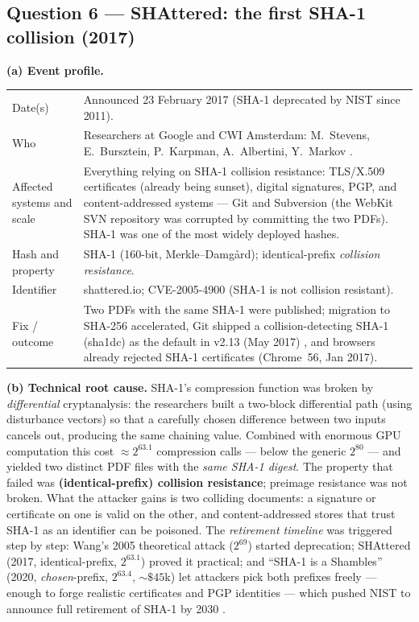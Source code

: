 \documentclass[11pt,a4paper]{article}
\begin{document}
\subsection*{Question 6 --- SHAttered: the first SHA-1 collision (2017)}
\textbf{(a) Event profile.}
\begin{table}[H]
\centering\small
\begin{tabularx}{\textwidth}{@{}P{3.6cm}L@{}}
\toprule
Date(s) & Announced 23 February 2017 (SHA-1 deprecated by NIST since 2011). \\
Who & Researchers at Google and CWI Amsterdam: M.~Stevens, E.~Bursztein, P.~Karpman, A.~Albertini, Y.~Markov \cite{shattered}. \\
Affected systems and scale & Everything relying on SHA-1 collision resistance: TLS/X.509 certificates (already being sunset), digital signatures, PGP, and content-addressed systems --- Git and Subversion (the WebKit SVN repository was corrupted by committing the two PDFs). SHA-1 was one of the most widely deployed hashes. \\
Hash and property & SHA-1 (160-bit, Merkle--Damg\aa rd); identical-prefix \emph{collision resistance}. \\
Identifier & shattered.io; CVE-2005-4900 (SHA-1 is not collision resistant). \\
Fix / outcome & Two PDFs with the same SHA-1 were published; migration to SHA-256 accelerated, Git shipped a collision-detecting SHA-1 (sha1dc) as the default in v2.13 (May 2017) \cite{git213}, and browsers already rejected SHA-1 certificates (Chrome~56, Jan 2017). \\
\bottomrule
\end{tabularx}
\end{table}

\textbf{(b) Technical root cause.} SHA-1's compression function was broken by \emph{differential}
cryptanalysis: the researchers built a two-block differential path (using disturbance vectors) so that a
carefully chosen difference between two inputs cancels out, producing the same chaining value. Combined
with enormous GPU computation this cost $\approx 2^{63.1}$ compression calls --- below the generic
$2^{80}$ --- and yielded two distinct PDF files with the \emph{same SHA-1 digest}. The property that
failed was \textbf{(identical-prefix) collision resistance}; preimage resistance was not broken. What the
attacker gains is two colliding documents: a signature or certificate on one is valid on the other, and
content-addressed stores that trust SHA-1 as an identifier can be poisoned. The \emph{retirement
timeline} was triggered step by step: Wang's 2005 theoretical attack ($2^{69}$) started deprecation;
SHAttered (2017, identical-prefix, $2^{63.1}$) proved it practical; and ``SHA-1 is a Shambles'' (2020,
\emph{chosen}-prefix, $2^{63.4}$, $\sim\$45$k) \cite{shambles} let attackers pick both prefixes freely
--- enough to forge realistic certificates and PGP identities --- which pushed NIST to announce full
retirement of SHA-1 by 2030 \cite{nistsha1}.
\end{document}
